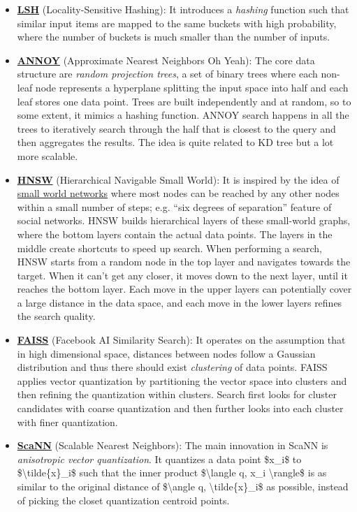 \begin{itemize}
\tightlist
\item
  \href{https://en.wikipedia.org/wiki/Locality-sensitive_hashing}{\textbf{LSH}} (Locality-Sensitive Hashing): It introduces a \emph{hashing} function such that similar input items are mapped to the same buckets with high probability, where the number of buckets is much smaller than the number of inputs.
\item
  \href{https://github.com/spotify/annoy}{\textbf{ANNOY}} (Approximate Nearest Neighbors Oh Yeah): The core data structure are \emph{random projection trees}, a set of binary trees where each non-leaf node represents a hyperplane splitting the input space into half and each leaf stores one data point. Trees are built independently and at random, so to some extent, it mimics a hashing function. ANNOY search happens in all the trees to iteratively search through the half that is closest to the query and then aggregates the results. The idea is quite related to KD tree but a lot more scalable.
\item
  \href{https://arxiv.org/abs/1603.09320}{\textbf{HNSW}} (Hierarchical Navigable Small World): It is inspired by the idea of \href{https://en.wikipedia.org/wiki/Small-world_network}{small world networks} where most nodes can be reached by any other nodes within a small number of steps; e.g. ``six degrees of separation'' feature of social networks. HNSW builds hierarchical layers of these small-world graphs, where the bottom layers contain the actual data points. The layers in the middle create shortcuts to speed up search. When performing a search, HNSW starts from a random node in the top layer and navigates towards the target. When it can't get any closer, it moves down to the next layer, until it reaches the bottom layer. Each move in the upper layers can potentially cover a large distance in the data space, and each move in the lower layers refines the search quality.
\item
  \href{https://github.com/facebookresearch/faiss}{\textbf{FAISS}} (Facebook AI Similarity Search): It operates on the assumption that in high dimensional space, distances between nodes follow a Gaussian distribution and thus there should exist \emph{clustering} of data points. FAISS applies vector quantization by partitioning the vector space into clusters and then refining the quantization within clusters. Search first looks for cluster candidates with coarse quantization and then further looks into each cluster with finer quantization.
\item
  \href{https://github.com/google-research/google-research/tree/master/scann}{\textbf{ScaNN}} (Scalable Nearest Neighbors): The main innovation in ScaNN is \emph{anisotropic vector quantization}. It quantizes a data point \$x\_i\$ to \$\textbackslash tilde\{x\}\_i\$ such that the inner product \$\textbackslash langle q, x\_i \textbackslash rangle\$ is as similar to the original distance of \$\textbackslash angle q, \textbackslash tilde\{x\}\_i\$ as possible, instead of picking the closet quantization centroid points.
\end{itemize}


